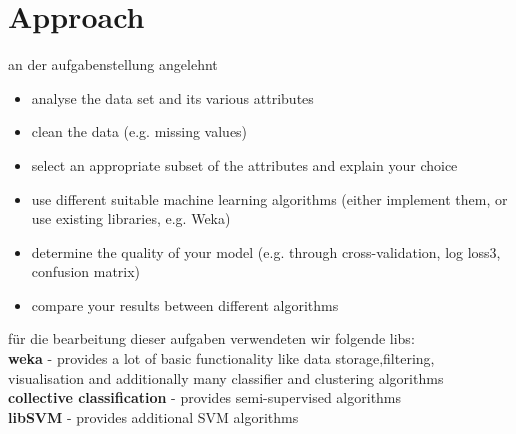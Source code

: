 \section{Approach}
\label{approach}


an der aufgabenstellung angelehnt

\begin{itemize}
	\item[\textbullet] analyse the data set and its various attributes
	\item[\textbullet] clean the data (e.g. missing values)
	\item[\textbullet] select an appropriate subset of the attributes and explain your choice
	\item[\textbullet] use different suitable machine learning algorithms (either implement them, or use existing libraries, e.g. Weka)
	\item[\textbullet] determine the quality of your model (e.g. through cross-validation, log loss3, confusion matrix)
	\item[\textbullet] compare your results between different algorithms
\end{itemize}

für die bearbeitung dieser aufgaben verwendeten wir folgende libs: \\
\textbf{weka} - provides a lot of basic functionality like data storage,filtering, visualisation and additionally many classifier and clustering algorithms \\
\textbf{collective classification} - provides semi-supervised algorithms \\
\textbf{libSVM} - provides additional SVM algorithms \\

